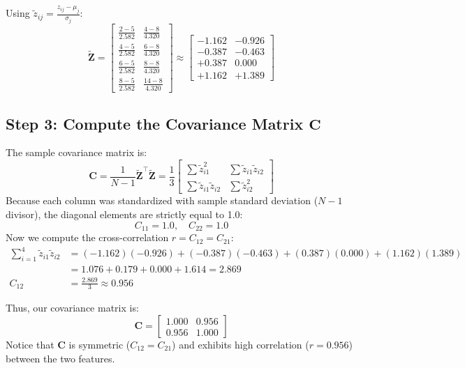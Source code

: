 \documentclass[11pt, a4paper]{article}
\begin{document}
Using $\tilde{z}_{ij} = \frac{z_{ij} - \mu_j}{\sigma_j}$:
$$\tilde{\mathbf{Z}} = \begin{bmatrix}
\frac{2-5}{2.582} & \frac{4-8}{4.320} \\[0.4em]
\frac{4-5}{2.582} & \frac{6-8}{4.320} \\[0.4em]
\frac{6-5}{2.582} & \frac{8-8}{4.320} \\[0.4em]
\frac{8-5}{2.582} & \frac{14-8}{4.320}
\end{bmatrix}
\approx \begin{bmatrix}
-1.162 & -0.926 \\[0.2em]
-0.387 & -0.463 \\[0.2em]
+0.387 & 0.000 \\[0.2em]
+1.162 & +1.389
\end{bmatrix}$$

\subsection{Step 3: Compute the Covariance Matrix $\mathbf{C}$}

The sample covariance matrix is:
$$\mathbf{C} = \frac{1}{N-1} \tilde{\mathbf{Z}}^\top \tilde{\mathbf{Z}} = \frac{1}{3} \begin{bmatrix}
\sum \tilde{z}_{i1}^2 & \sum \tilde{z}_{i1}\tilde{z}_{i2} \\[0.3em]
\sum \tilde{z}_{i1}\tilde{z}_{i2} & \sum \tilde{z}_{i2}^2
\end{bmatrix}$$
Because each column was standardized with sample standard deviation ($N-1$ divisor), the diagonal elements are strictly equal to 1.0:
$$C_{11} = 1.0, \quad C_{22} = 1.0$$
Now we compute the cross-correlation $r = C_{12} = C_{21}$:
\begin{align*}
\sum_{i=1}^4 \tilde{z}_{i1}\tilde{z}_{i2} &= (-1.162)(-0.926) + (-0.387)(-0.463) + (0.387)(0.000) + (1.162)(1.389) \\
&= 1.076 + 0.179 + 0.000 + 1.614 = 2.869 \\[0.3em]
C_{12} &= \frac{2.869}{3} \approx 0.956
\end{align*}

Thus, our covariance matrix is:
$$\mathbf{C} = \begin{bmatrix}
1.000 & 0.956 \\[0.2em]
0.956 & 1.000
\end{bmatrix}$$
Notice that $\mathbf{C}$ is symmetric ($C_{12} = C_{21}$) and exhibits high correlation ($r = 0.956$) between the two features.
\end{document}
